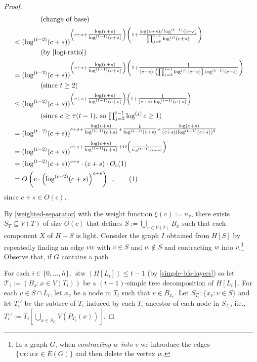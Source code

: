 \documentclass[kpfonts]{patmorin}
\newcommand\numberthis{\addtocounter{equation}{1}\tag{\theequation}}
\DeclareMathOperator{\stw}{stw}
\theoremstyle{named}
\begin{document}
\begin{proof}
\begin{align*}
            & \qquad\qquad\text{(change of base)} \\
        & < (\log^{(t-2)}(c+s))^{\left(c+s+\tfrac{\log(c+s)}{\log^{(t-1)}(c+s)}\right)
            \left(1 + \tfrac{\log(c+s)/\log^{(t-1)}(c+s)}{\prod_{j=0}^{t-1}\log^{(j)}(c+s)}\right)} \\
            & \qquad\qquad\text{(by \cref{logi-ratio})}\\
        & = (\log^{(t-2)}(c+s))^{\left(c+s+\tfrac{\log(c+s)}{\log^{(t-1)}(c+s)}\right)
            \left(1 + \tfrac{1}{(c+s)\cdot\left(\prod_{j=2}^{t-1}\log^{(j)}(c+s)\right)\log^{(t-1)}(c+s)}\right)} \\
            & \qquad\qquad\text{(since $t\ge 2$)}\\
        & \le (\log^{(t-2)}(c+s))^{\left(c+s+\tfrac{\log(c+s)}{\log^{(t-1)}(c+s)}\right)
            \left(1 + \tfrac{1}{(c+s)\cdot \log^{(t-1)}(c+s)}\right)} \\
            & \qquad\qquad\text{(since $c\ge \tau(t-1)$, so $\textstyle \prod_{j=2}^{t-1}\log^{(j)}c\ge 1$)} \\
        & = (\log^{(t-2)}(c+s))^{c+s+\tfrac{\log(c+s)}{\log^{(t-1)}(c+s)} +
            \tfrac{1}{\log^{(t-1)}(c+s)} + \tfrac{\log(c+s)}{(c+s)(\log^{(t-1)}(c+s))^2}}  \\
        & = (\log^{(t-2)}(c+s))^{c+s+\tfrac{\log(c+s)}{\log^{(t-1)}(c+s)} + O\left(\frac{1}{\log^{(t-1)}(c+s)}\right)}  \\
        & = (\log^{(t-2)}(c+s))^{c+s}\cdot (c+s)\cdot O_c(1) \\
        & = O\left(c\cdot\left(\log^{(t-2)}(c+s)\right)^{c+s}\right) \enspace ,
        \numberthis \label{sizer}
    \end{align*}
    since $c+s\in O(c)$.

    By \cref{weighted-separator} with the weight function $\xi(v):=n_v$, there exists $S_T\subseteq V(T)$ of size $O(c)$ that defines $S:=\bigcup_{x\in V(T)} B_x$ such that each component $X$ of $H-S$ is light.  Consider the graph $I$ obtained from $H[S]$ by repeatedly finding an edge $vw$ with $v\in S$ and $w\not\in S$ and contracting $w$ into $v$.\footnote{In a  graph $G$, when \emph{contracting $w$ into $v$} we introduce the edges $\{vx: wx\in E(G)\}$ and then delete the vertex $w$.}  Observe that, if $G$ contains a path


    For each $i\in\{0,\ldots,h\}$, $\stw(H[L_i])\le t-1$ (by \cref{simple-bfs-layers}) so let $\mathcal{T}_i:=(B_x:x\in V(T_i))$ be a $(t-1)$-simple tree decomposition of $H[L_i]$.  For each $v\in S\cap L_i$, let $x_v$ be a node in $T_i$ such that $v\in B_{x_v}$.  Let $S_{T_i}:\{x_v:v\in S\}$ and let $T_i'$ be the subtree of $T_i$ induced by each $T_i$-ancestor of each node in $S_{T_i}$, i.e., $T_i':=T_i[\bigcup_{x\in S_{T_i}} V(P_{T_i}(x))]$.


\end{proof}
\end{document}
